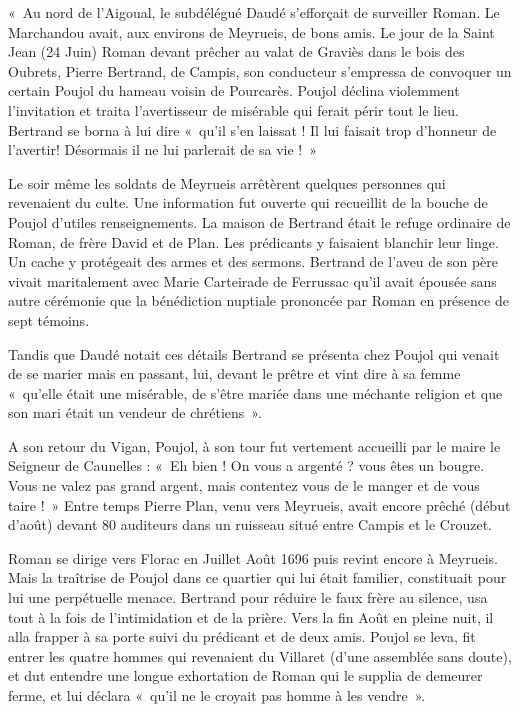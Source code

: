 \begin{tcolorbox}[
  colback=white,
  colframe=black,
  boxrule=0.7pt,
  arc=0pt,
  left=0.20cm,
  right=0.20cm,
  top=0.10cm,
  bottom=0.10cm,
  boxsep=0pt
]
\small

«~Au nord de l’Aigoual, le subdélégué Daudé s’efforçait de surveiller Roman. Le Marchandou avait, aux environs de Meyrueis, de bons amis. Le jour de la Saint Jean (24 Juin) Roman devant prêcher au valat de Graviès dans le bois des Oubrets, Pierre Bertrand, de Campis, son conducteur s’empressa de convoquer un certain Poujol du hameau voisin de Pourcarès. Poujol déclina violemment l’invitation et traita l’avertisseur de misérable qui ferait périr tout le lieu. Bertrand se borna à lui dire «~qu’il s’en laissat ! Il lui faisait trop d’honneur de l’avertir! Désormais il ne lui parlerait de sa vie !~»

Le soir même les soldats de Meyrueis arrêtèrent quelques personnes qui revenaient du culte. Une information fut ouverte qui recueillit de la bouche de Poujol d’utiles renseignements. La maison de Bertrand était le refuge ordinaire de Roman, de frère David et de Plan. Les prédicants y faisaient blanchir leur linge. Un cache y protégeait des armes et des sermons. Bertrand de l’aveu de son père vivait maritalement avec Marie Carteirade de Ferrussac qu’il avait épousée sans autre cérémonie que la bénédiction nuptiale prononcée par Roman en présence de sept témoins.

Tandis que Daudé notait ces détails Bertrand se présenta chez Poujol qui venait de se marier mais en passant, lui, devant le prêtre et vint dire à sa femme «~qu’elle était une misérable, de s’être mariée dans une méchante religion et que son mari était un vendeur de chrétiens~».

A son retour du Vigan, Poujol, à son tour fut vertement accueilli par le maire le Seigneur de Caunelles : «~Eh bien ! On vous a argenté ? vous êtes un bougre. Vous ne valez pas grand argent, mais contentez vous de le manger et de vous taire !~» Entre temps Pierre Plan, venu vers Meyrueis, avait encore prêché (début d’août) devant 80 auditeurs dans un ruisseau situé entre Campis et le Crouzet.

Roman se dirige vers Florac en Juillet Août 1696 puis revint encore à Meyrueis. Mais la traîtrise de Poujol dans ce quartier qui lui était familier, constituait pour lui une perpétuelle menace. Bertrand pour réduire le faux frère au silence, usa tout à la fois de l’intimidation et de la prière. Vers la fin Août en pleine nuit, il alla frapper à sa porte suivi du prédicant et de deux amis. Poujol se leva, fit entrer les quatre hommes qui revenaient du Villaret (d’une assemblée sans doute), et dut entendre une longue exhortation de Roman qui le supplia de demeurer ferme, et lui déclara «~qu’il ne le croyait pas homme à les vendre~».


\end{tcolorbox}
